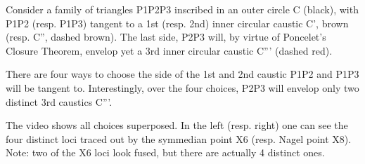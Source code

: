 Consider a family of triangles P1P2P3 inscribed in an outer circle C (black), with P1P2 (resp. P1P3) tangent to a 1st (resp. 2nd) inner circular caustic C', brown (resp. C'', dashed brown). The last side, P2P3 will, by virtue of Poncelet's Closure Theorem, envelop yet a 3rd inner circular caustic C''' (dashed red).

There are four ways to choose the side of the 1st and 2nd caustic P1P2 and P1P3 will be tangent to. Interestingly, over the four choices, P2P3 will envelop only two distinct 3rd caustics C'''.

The video shows all choices superposed. In the left (resp. right) one can see the four distinct loci traced out by the symmedian point X6 (resp. Nagel point X8). Note: two of the X6 loci look fused, but there are actually 4 distinct ones.